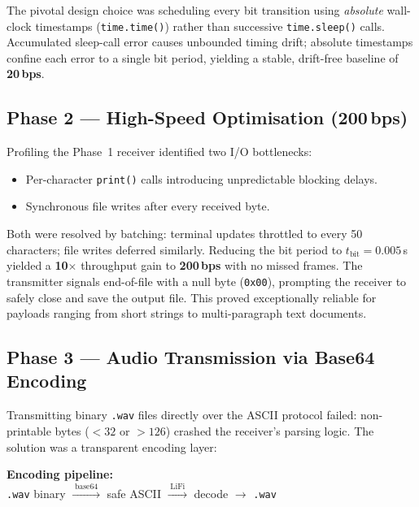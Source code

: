 \documentclass[10pt, twocolumn, a4paper]{article}
\begin{document}
The pivotal design choice was scheduling every bit transition using \emph{absolute} wall-clock timestamps (\texttt{time.time()}) rather than successive \texttt{time.sleep()} calls. Accumulated sleep-call error causes unbounded timing drift; absolute timestamps confine each error to a single bit period, yielding a stable, drift-free baseline of \textbf{20\,bps}.

\subsection{Phase 2 — High-Speed Optimisation (200\,bps)}

Profiling the Phase~1 receiver identified two I/O bottlenecks:

\begin{itemize}[leftmargin=12pt, itemsep=1pt]
  \item Per-character \texttt{print()} calls introducing unpredictable blocking delays.
  \item Synchronous file writes after every received byte.
\end{itemize}

Both were resolved by batching: terminal updates throttled to every 50 characters; file writes deferred similarly. Reducing the bit period to $t_\text{bit} = 0.005$\,s yielded a \textbf{10$\times$} throughput gain to \textbf{200\,bps} with no missed frames. The transmitter signals end-of-file with a null byte (\texttt{0x00}), prompting the receiver to safely close and save the output file. This proved exceptionally reliable for payloads ranging from short strings to multi-paragraph text documents.

\subsection{Phase 3 — Audio Transmission via Base64 Encoding}

Transmitting binary \texttt{.wav} files directly over the ASCII protocol failed: non-printable bytes ($<\!32$ or $>\!126$) crashed the receiver's parsing logic. The solution was a transparent encoding layer:

\begin{infobox}
\textbf{Encoding pipeline:}\\[4pt]
\hspace*{4pt}\texttt{.wav} binary \;$\xrightarrow{\;\text{base64}\;}$\; safe ASCII \;$\xrightarrow{\;\text{LiFi}\;}$\; decode \;$\xrightarrow{}$\; \texttt{.wav}
\end{infobox}
\end{document}
